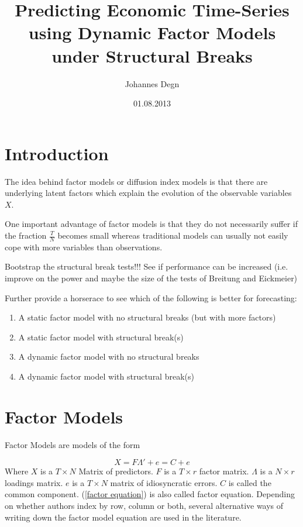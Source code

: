 \documentclass[11pt]{article}
\title{\textbf{Predicting Economic Time-Series using Dynamic Factor Models under Structural Breaks}}
\author{Johannes Degn}
\date{01.08.2013}
\begin{document}
\maketitle

\tableofcontents

\section{Introduction}

The idea behind factor models or diffusion index models is that there are underlying latent factors which explain the evolution of the observable variables $X$. 

One important advantage of factor models is that they do not necessarily suffer if the fraction $\frac{T}{N}$ becomes small whereas traditional models can usually not easily cope with more variables than observations.

Bootstrap the structural break tests!!! See if performance can be increased (i.e. improve on the power and maybe the size of the tests of Breitung and Eickmeier)

Further provide a horserace to see which of the following is better for forecasting:
\begin{enumerate}
	\item A static factor model with no structural breaks (but with more factors)
	\item A static factor model with structural break(s)
	\item A dynamic factor model with no structural breaks
	\item A dynamic factor model with structural break(s)
\end{enumerate}


\section{Factor Models}


Factor Models are models of the form 

\begin{equation}
	\label{factor equation}
	X = F \Lambda' + e = C + e
\end{equation}
Where $X$ is a $T \times N$ Matrix of predictors. $F$ is a $T \times r$ factor matrix. $\Lambda$ is a $N \times r$ loadings matrix. $e$ is a $T \times N$ matrix of idiosyncratic errors. $C$ is called the common component. (\ref{factor equation}) is also called factor equation.
Depending on whether authors index by row, column or both, several alternative ways of writing down the factor model equation are used in the literature.
\end{document}
